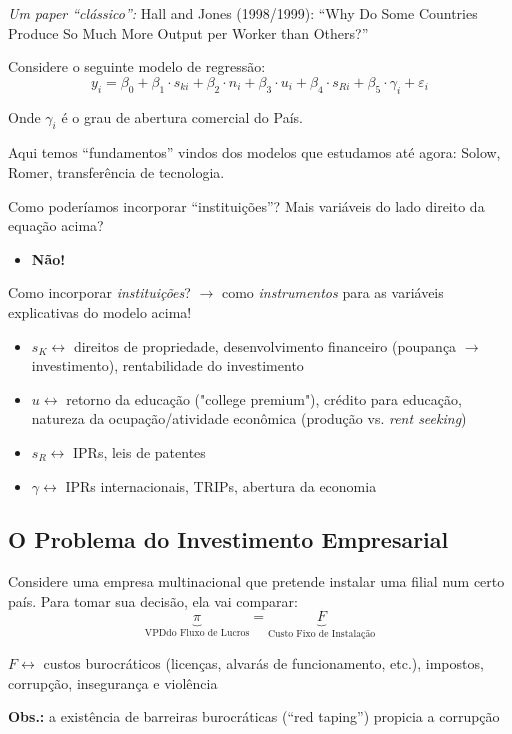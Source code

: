 \documentclass[a4paper,12pt]{article}[abntex2]
\begin{document}
\textit{Um paper “clássico”: }Hall and Jones (1998/1999): “Why Do Some Countries Produce So Much More Output per Worker than Others?”

Considere o seguinte modelo de regressão:
\[
y_i = \beta_0 + \beta_1 \cdot s_{ki} + \beta_2 \cdot n_i + \beta_3 \cdot u_i + \beta_4 \cdot s_{Ri} + \beta_5 \cdot \gamma_i + \varepsilon_i
\]

Onde \(\gamma_i\) é o grau de abertura comercial do País.

Aqui temos “fundamentos” vindos dos modelos que estudamos até agora: Solow, Romer, transferência de tecnologia.

Como poderíamos incorporar “instituições”? Mais variáveis do lado direito da equação acima?\begin{itemize}
    \item  \textbf{Não!}
\end{itemize}

Como incorporar \textit{instituições}? $\rightarrow$ como \textit{instrumentos} para as variáveis explicativas do modelo acima!

\begin{itemize}
    \item $s_K \leftrightarrow$ direitos de propriedade, desenvolvimento financeiro (poupança $\rightarrow$ investimento), rentabilidade do investimento
    \item $u \leftrightarrow$ retorno da educação ("college premium"), crédito para educação, natureza da ocupação/atividade econômica (produção vs. \textit{rent seeking})
    \item $s_R \leftrightarrow$ IPRs, leis de patentes
    \item $\gamma \leftrightarrow$ IPRs internacionais, TRIPs, abertura da economia
\end{itemize}


\subsection{\textbf{O Problema do Investimento Empresarial}}
Considere uma empresa multinacional que pretende instalar uma filial num certo país. Para tomar sua decisão, ela vai comparar:
\[
\underbrace{\pi}_\text{VPDdo Fluxo de Lucros}= \underbrace{F}_\text{Custo Fixo de Instalação}
\]

$F \leftrightarrow$ custos burocráticos (licenças, alvarás de funcionamento, etc.), impostos, corrupção, insegurança e violência

\textbf{Obs.:} a existência de barreiras burocráticas (“red taping”) propicia a corrupção
\end{document}
